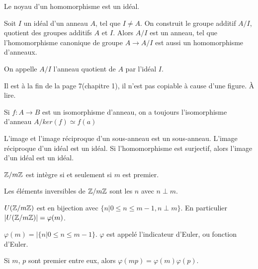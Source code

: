 \documentclass[12pt,a4paper]{article}
\begin{document}
\begin{flushleft}
\begin{prop}
Le noyau d'un homomorphisme est un idéal.
\end{prop}

\begin{prop}
Soit $I$ un idéal d'un anneau $A$, tel que $I \neq A$. On construit le groupe additif $A/I$, quotient des groupes additifs $A$ et $I$. Alors $A/I$ est un anneau, tel que l'homomorphisme canonique de groupe $A \longrightarrow A/I$ est aussi un homomorphisme d'anneaux.
\end{prop}

\begin{mydef}
On appelle $A/I$ l'anneau quotient de $A$ par l'idéal $I$.
\end{mydef}

\begin{thm}
Il est à la fin de la page 7(chapitre 1), il n'est pas copiable à cause d'une figure. À lire.
\end{thm}

\begin{cor}
Si $f: A\longrightarrow B$ est un isomorphisme d'anneau, on a toujours l'isomorphisme d'anneau $A/ker(f) \simeq f(a)$
\end{cor}

\begin{prop}
L'image et l'image réciproque d'un sous-anneau est un sous-anneau. L'image réciproque d'un idéal est un idéal. Si l'homomorphisme est surjectif, alors l'image d'un idéal est un idéal.
\end{prop}

\begin{prop} 
$\mathbb{Z} / m \mathbb{Z}$ est intègre si et seulement si $m$ est premier.
\end{prop}

\begin{prop}
Les éléments inversibles de $\mathbb{Z} / m \mathbb{Z}$ sont les $n$ avec $ n \perp m$. 
\end{prop}

\begin{cor}
$U(\mathbb{Z} / m \mathbb{Z} )$ est en bijection avec $\{ n | 0 \leqslant n \leqslant m-1, n \perp m  \} $. En particulier $| U(\mathbb{Z} / m \mathbb{Z})| = \varphi (m)$.
\end{cor}

\begin{rap}
$\varphi (m) = | \{ n | 0 \leqslant n \leqslant m-1 \}$. $\varphi$ est appelé l'indicateur d'Euler, ou fonction d'Euler.
\end{rap}

\begin{prop}
Si $m$, $p$ sont premier entre eux, alors $\varphi (m p) = \varphi (m) \varphi (p)$.
\end{prop}


\end{flushleft}
\end{document}
